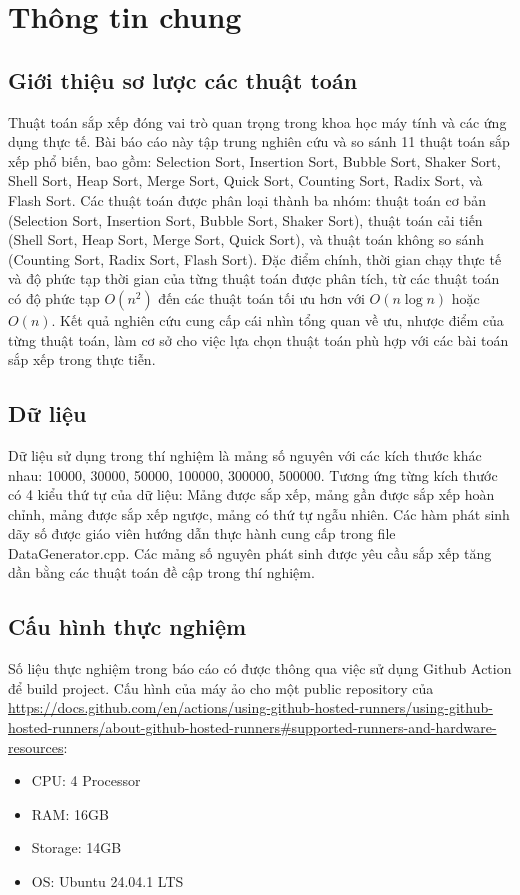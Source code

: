 \section{Thông tin chung}

\subsection{Giới thiệu sơ lược các thuật toán}

Thuật toán sắp xếp đóng vai trò quan trọng trong khoa học máy tính và các ứng dụng thực tế. Bài báo cáo này tập trung nghiên cứu và so sánh 11 thuật toán sắp xếp phổ biến, bao gồm: Selection Sort, Insertion Sort, Bubble Sort, Shaker Sort, Shell Sort, Heap Sort, Merge Sort, Quick Sort, Counting Sort, Radix Sort, và Flash Sort. Các thuật toán được phân loại thành ba nhóm: thuật toán cơ bản (Selection Sort, Insertion Sort, Bubble Sort, Shaker Sort), thuật toán cải tiến (Shell Sort, Heap Sort, Merge Sort, Quick Sort), và thuật toán không so sánh (Counting Sort, Radix Sort, Flash Sort). Đặc điểm chính, thời gian chạy thực tế và độ phức tạp thời gian của từng thuật toán được phân tích, từ các thuật toán có độ phức tạp $O(n^2)$ đến các thuật toán tối ưu hơn với $O(n \log n)$ hoặc $O(n)$. Kết quả nghiên cứu cung cấp cái nhìn tổng quan về ưu, nhược điểm của từng thuật toán, làm cơ sở cho việc lựa chọn thuật toán phù hợp với các bài toán sắp xếp trong thực tiễn.

\subsection{Dữ liệu}

Dữ liệu sử dụng trong thí nghiệm là mảng số nguyên với các kích thước khác nhau: 10000, 30000, 50000, 100000, 300000, 500000. Tương ứng từng kích thước có 4 kiểu thứ tự của dữ liệu: Mảng được sắp xếp, mảng gần được sắp xếp hoàn chỉnh, mảng được sắp xếp ngược, mảng có thứ tự ngẫu nhiên. Các hàm phát sinh dãy số được giáo viên hướng dẫn thực hành cung cấp trong file DataGenerator.cpp. Các mảng số nguyên phát sinh được yêu cầu sắp xếp tăng dần bằng các thuật toán đề cập trong thí nghiệm.

\subsection{Cấu hình thực nghiệm}
Số liệu thực nghiệm trong báo cáo có được thông qua việc sử dụng Github Action để build project. Cấu hình của máy ảo cho một public repository của \href{Github}{https://docs.github.com/en/actions/using-github-hosted-runners/using-github-hosted-runners/about-github-hosted-runners#supported-runners-and-hardware-resources}:
\begin{itemize}
    \item CPU: 4 Processor
    \item RAM: 16GB
    \item Storage: 14GB
    \item OS: Ubuntu 24.04.1 LTS
\end{itemize}
 

 
